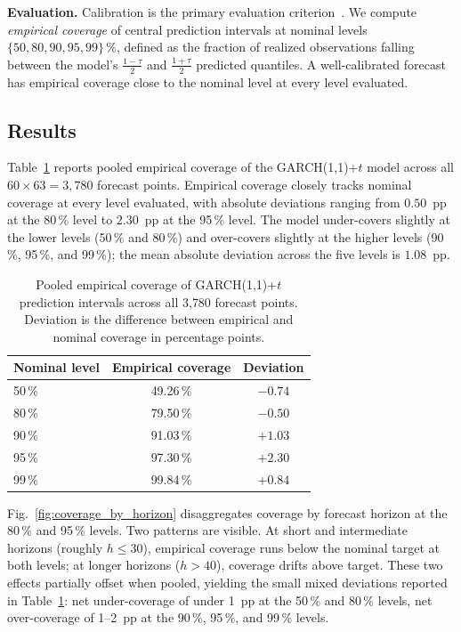 \documentclass[journal]{IEEEtran}
\begin{document}
\textbf{Evaluation.}  Calibration is the primary evaluation
criterion~\cite{christoffersen1998,dieboldguntahertay1998}.  We compute
\emph{empirical coverage} of central prediction intervals at nominal
levels $\{50, 80, 90, 95, 99\}\,\%$, defined as the fraction of realized
observations falling between the model's $\tfrac{1-\tau}{2}$ and
$\tfrac{1+\tau}{2}$ predicted quantiles.  A well-calibrated forecast has
empirical coverage close to the nominal level at every level evaluated.

\subsection{Results}
\label{sec:results}

Table~\ref{tab:coverage_pooled} reports pooled empirical coverage of the
GARCH(1,1)+$t$ model across all $60 \times 63 = 3{,}780$ forecast points.
Empirical coverage closely tracks nominal coverage at every level
evaluated, with absolute deviations ranging from $0.50$~pp at the
80\,\% level to $2.30$~pp at the 95\,\% level.  The model under-covers
slightly at the lower levels (50\,\% and 80\,\%) and over-covers
slightly at the higher levels (90\,\%, 95\,\%, and 99\,\%); the mean
absolute deviation across the five levels is $1.08$~pp.

\begin{table}[t]
\caption{Pooled empirical coverage of GARCH(1,1)+$t$ prediction intervals
across all 3{,}780 forecast points.  Deviation is the difference between
empirical and nominal coverage in percentage points.}
\label{tab:coverage_pooled}
\centering
\small
\begin{tabular}{lcc}
\toprule
Nominal level & Empirical coverage & Deviation \\
\midrule
50\,\% & 49.26\,\% & $-0.74$ \\
80\,\% & 79.50\,\% & $-0.50$ \\
90\,\% & 91.03\,\% & $+1.03$ \\
95\,\% & 97.30\,\% & $+2.30$ \\
99\,\% & 99.84\,\% & $+0.84$ \\
\bottomrule
\end{tabular}
\end{table}

Fig.~\ref{fig:coverage_by_horizon} disaggregates coverage by forecast
horizon at the 80\,\% and 95\,\% levels.  Two patterns are visible.  At
short and intermediate horizons (roughly $h \leq 30$), empirical coverage
runs below the nominal target at both levels; at longer horizons
($h > 40$), coverage drifts above target.  These two effects partially
offset when pooled, yielding the small mixed deviations reported in
Table~\ref{tab:coverage_pooled}: net under-coverage of under 1~pp at
the 50\,\% and 80\,\% levels, net over-coverage of 1--2~pp at the 90\,\%,
95\,\%, and 99\,\% levels.
\end{document}
